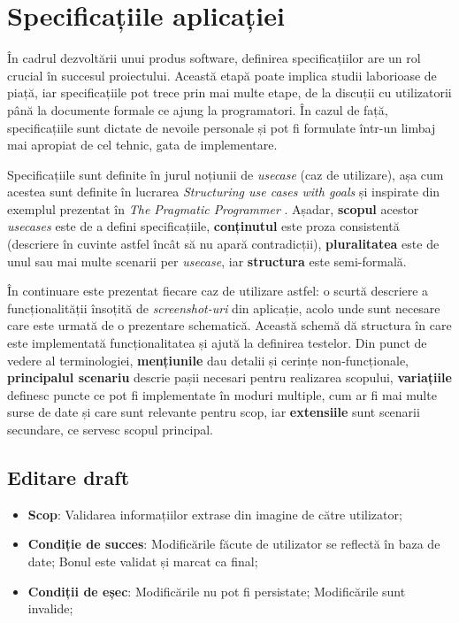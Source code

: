 \chapter{Specificațiile aplicației}\label{specs}

În cadrul dezvoltării unui produs software, definirea specificațiilor are un rol crucial în succesul proiectului. Această etapă poate implica studii laborioase de piață, iar specificațiile pot trece prin mai multe etape, de la discuții cu utilizatorii până la documente formale ce ajung la programatori. În cazul de față, specificațiile sunt dictate de nevoile personale și pot fi formulate într-un limbaj mai apropiat de cel tehnic, gata de implementare.

Specificațiile sunt definite în jurul noțiunii de \emph{usecase} (caz de utilizare), așa cum acestea sunt definite în lucrarea \emph{Structuring use cases with goals} \cite{cockburn1997structuring} și inspirate din exemplul prezentat în \emph{The Pragmatic Programmer} \cite{Hunt:2000:PPJ:320326}. Așadar, \textbf{scopul} acestor \emph{usecases} este de a defini specificațiile, \textbf{conținutul} este proza consistentă (descriere în cuvinte astfel încât să nu apară contradicții), \textbf{pluralitatea} este de unul sau mai multe scenarii per \emph{usecase}, iar \textbf{structura} este semi-formală.

În continuare este prezentat fiecare caz de utilizare astfel: o scurtă descriere a funcționalității însoțită de \emph{screenshot-uri} din aplicație, acolo unde sunt necesare care este urmată de o prezentare schematică. Această schemă dă structura în care este implementată funcționalitatea și ajută la definirea testelor. Din punct de vedere al terminologiei, \textbf{mențiunile} dau detalii și cerințe non-funcționale, \textbf{principalul scenariu} descrie pașii necesari pentru realizarea scopului, \textbf{variațiile} definesc puncte ce pot fi implementate în moduri multiple, cum ar fi mai multe surse de date și care sunt relevante pentru scop, iar \textbf{extensiile} sunt scenarii secundare, ce servesc scopul principal.



\section{Editare draft}\label{editare-draft}

\begin{itemize}
\item
  \textbf{Scop}: Validarea informațiilor extrase din imagine de către utilizator;
\item
  \textbf{Condiție de succes}: Modificările făcute de utilizator se reflectă în baza de date; Bonul este validat și marcat ca final;
\item
  \textbf{Condiții de eșec}: Modificările nu pot fi persistate; Modificările sunt invalide;
\end{itemize}

